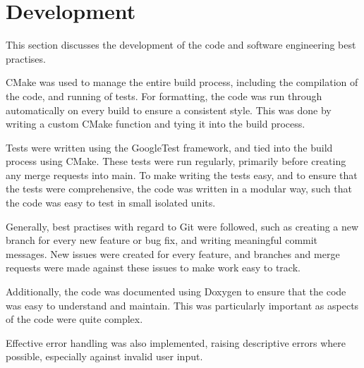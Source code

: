 
\section{Development}\label{sec:development}
    This section discusses the development of the code and software engineering best practises.

    CMake was used to manage the entire build process, including the compilation of the code, and running of tests.
    For formatting, the code was run through  automatically on every build to ensure a consistent
    style.
    This was done by writing a custom CMake function and tying it into the build process.

    Tests were written using the GoogleTest framework, and tied into the build process using CMake.
    These tests were run regularly, primarily before creating any merge requests into main.
    To make writing the tests easy, and to ensure that the tests were comprehensive, the code was written in a modular
    way, such that the code was easy to test in small isolated units.

    Generally, best practises with regard to Git were followed, such as creating a new branch for every new feature
    or bug fix, and writing meaningful commit messages.
    New issues were created for every feature, and branches and merge requests were made against these issues to make
    work easy to track.

    Additionally, the code was documented using Doxygen to ensure that the code was easy to understand and maintain.
    This was particularly important as aspects of the code were quite complex.

    Effective error handling was also implemented, raising descriptive errors where possible, especially against
    invalid user input.


